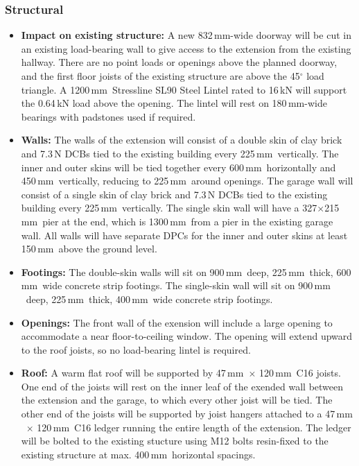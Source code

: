 \documentclass{extension}
\newcommand{\mm}{\,$\mathrm{mm}$}
\begin{document}
\subsubsection{Structural}
\begin{itemize}
  \item {\bf Impact on existing structure:} A new 832\mm -wide doorway will be cut in an existing load-bearing wall to give access to the extension from the existing hallway. There are no point loads or openings above the planned doorway, and the first floor joists of the existing structure are above the 45$^\circ$ load triangle. A 1200\mm\ Stressline SL90 Steel Lintel rated to 16\,kN will support the 0.64\,kN load above the opening. The lintel will rest on 180\mm -wide bearings with padstones used if required.
  \item {\bf Walls:} The walls of the extension will consist of a double skin of clay brick and 7.3\,N DCBs tied to the existing building every 225\mm\ vertically. The inner and outer skins will be tied together every 600\mm\ horizontally and 450\mm\ vertically, reducing to 225\mm\ around openings. The garage wall will consist of a single skin of clay brick and 7.3\,N DCBs tied to the existing building every 225\mm\ vertically. The single skin wall will have a 327$\times$215\mm\ pier at the end, which is 1300\mm\ from a pier in the existing garage wall. All walls will have separate DPCs for the inner and outer skins at least 150\mm\ above the ground level.
  \item {\bf Footings:} The double-skin walls will sit on 900\mm\ deep, 225\mm\ thick, 600\mm\ wide concrete strip footings. The single-skin wall will sit on 900\mm\ deep, 225\mm\ thick, 400\mm\ wide concrete strip footings.
  \item {\bf Openings:} The front wall of the exension will include a large opening to accommodate a near floor-to-ceiling window. The opening will extend upward to the roof joists, so no load-bearing lintel is required.
  \item {\bf Roof:} A warm flat roof will be supported by 47\mm\ $\times$ 120\mm\ C16 joists. One end of the joists will rest on the inner leaf of the exended wall between the extension and the garage, to which every other joist will be tied. The other end of the joists will be supported by joist hangers attached to a 47\mm\ $\times$ 120\mm\ C16 ledger running the entire length of the extension. The ledger will be bolted to the existing stucture using M12 bolts resin-fixed to the existing structure at max. 400\mm\ horizontal spacings.

\end{itemize}
\end{document}

